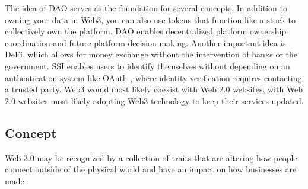 \vspace{.5cm}

The idea of \ac{DAO} serves as the foundation for several concepts. In addition to owning your data in Web3, you can also use tokens that function like a stock to collectively own the platform. \ac{DAO} enables decentralized platform ownership coordination and future platform decision-making. Another important idea is \ac{DeFi}, which allows for money exchange without the intervention of banks or the government. \ac{SSI} enables users to identify themselves without depending on an authentication system like OAuth \cite{oauth}, where identity verification requires contacting a trusted party. Web3 would most likely coexist with Web 2.0 websites, with Web 2.0 websites most likely adopting Web3 technology to keep their services updated.

\subsection{Concept}

Web 3.0 may be recognized by a collection of traits that are altering how people connect outside of the physical world and have an impact on how businesses are made \cite{concept}: 

\vspace{.5cm}


